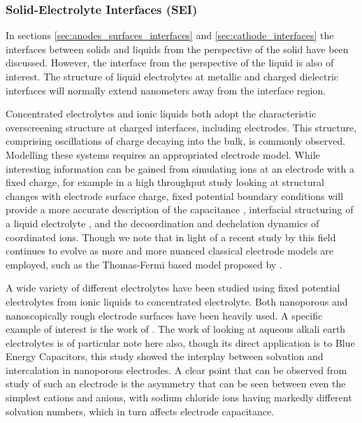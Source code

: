 \documentclass[../main.tex]{subfiles}
\begin{document}
\subsubsection{Solid-Electrolyte Interfaces (SEI)}
In sections \ref{sec:anodes_surfaces_interfaces} and \ref{sec:cathode_interfaces} the interfaces between solids and liquids from the perspective of the solid have been discussed. However, the interface from the perspective of the liquid is also of interest. The structure of liquid electrolytes at metallic\cite{merlet_simulating_2013} and charged dielectric\cite{smith_electrostatic_2016} interfaces will normally extend nanometers away from the interface region.

Concentrated electrolytes and ionic liquids both adopt the characteristic overscreening structure at charged interfaces, including electrodes. This structure, comprising oscillations of charge decaying into the bulk, is commonly observed\cite{coles_nanostructure_2017,merlet_simulating_2013}. Modelling these systems requires an appropriated electrode model. While interesting information can be gained from simulating ions at an electrode with a fixed charge, for example in a high throughput study looking at structural changes with electrode surface charge\cite{coles_nanostructure_2017}, fixed potential boundary conditions will provide a more accurate description of the capacitance \cite{merlet_simulating_2013, scalfi_semiclassical_2020}, interfacial structuring of a liquid electrolyte \cite{coles_simulation_2019, vatamanu_ramifications_2017, li_capacitive_2018}, and the decoordination and dechelation dynamics of coordinated ions\cite{vatamanu_molecular_2009}. Though we note that in light of a recent study by \citeauthor{scalfi_semiclassical_2020} this field continues to evolve as more and more nuanced classical electrode models are employed, such as the Thomas-Fermi based model proposed by \citeauthor{scalfi_semiclassical_2020} \cite{scalfi_semiclassical_2020}.

A wide variety of different electrolytes have been studied using fixed potential electrolytes from ionic liquids to concentrated electrolyte. Both nanoporous \cite{merlet_highly_2013, merlet_molecular_2012, vatamanu_molecular_2009, vatamanu_ramifications_2017} and nanoscopically rough electrode surfaces have been heavily used\cite{vatamanu_influence_2011}. A specific example of interest is the work of \citeauthor{borodin_interfacial_2014}. The work of \citeauthor{Simoncelli_2018} looking at aqueous alkali earth electrolytes is of particular note here also, though its direct application is to Blue Energy Capacitors, this study showed the interplay between solvation and intercalation in nanoporous electrodes. A clear point that can be observed from study of such an electrode is the asymmetry that can be seen between even the simplest cations and anions, with sodium chloride ions having markedly different solvation numbers, which in turn affects electrode capacitance\cite{Simoncelli_2018}.  
\end{document}
